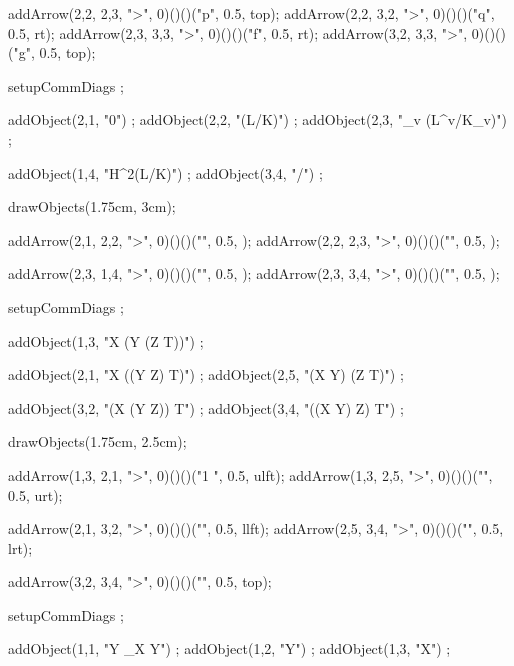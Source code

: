   addArrow(2,2, 2,3, ">", 0)()()("p", 0.5, top);
  addArrow(2,2, 3,2, ">", 0)()()("q", 0.5, rt);
  addArrow(2,3, 3,3, ">", 0)()()("f", 0.5, rt);
  addArrow(3,2, 3,3, ">", 0)()()("g", 0.5, top);
\stopMPcode\stopformula
\stopbuffer

\processTEXbuffer

\typebuffer

\startbuffer
\startformula{}
  setupCommDiags ;
  
  addObject(2,1, "0") ;
  addObject(2,2, "(L/K)") ;
  addObject(2,3, "\bigoplus_v (L^v/K_v)") ;
  
  addObject(1,4, "H^2(L/K)") ;
  addObject(3,4, "/") ;
    
  drawObjects(1.75cm, 3cm);
  
  addArrow(2,1, 2,2, ">", 0)()()("", 0.5, );
  addArrow(2,2, 2,3, ">", 0)()()("", 0.5, );
  
  addArrow(2,3, 1,4, ">", 0)()()("", 0.5, );
  addArrow(2,3, 3,4, ">", 0)()()("", 0.5, );
\stopMPcode\stopformula
\stopbuffer

\processTEXbuffer

\typebuffer

\startbuffer
\startformula{}
  setupCommDiags ;
  
  addObject(1,3, "X \otimes (Y \otimes (Z \otimes T))") ;
  
  addObject(2,1, "X \otimes ((Y \otimes Z) \otimes T)") ;
  addObject(2,5, "(X \otimes Y) \otimes (Z \otimes T)") ;
  
  addObject(3,2, "(X \otimes (Y \otimes Z)) \otimes T") ;
  addObject(3,4, "((X \otimes Y) \otimes Z) \otimes T") ;
    
  drawObjects(1.75cm, 2.5cm);
  
  addArrow(1,3, 2,1, ">", 0)()()("1 \otimes \phi", 0.5, ulft);
  addArrow(1,3, 2,5, ">", 0)()()("\phi", 0.5, urt);
  
  addArrow(2,1, 3,2, ">", 0)()()("\phi", 0.5, llft);
  addArrow(2,5, 3,4, ">", 0)()()("\phi", 0.5, lrt);
  
  addArrow(3,2, 3,4, ">", 0)()()("\phi {}", 0.5, top);
\stopMPcode\stopformula
\stopbuffer

\processTEXbuffer

\typebuffer

\startbuffer
\startformula{}
  setupCommDiags ;
  
  addObject(1,1, "Y \times_X Y") ;
  addObject(1,2, "Y") ;
  addObject(1,3, "X") ;
    
